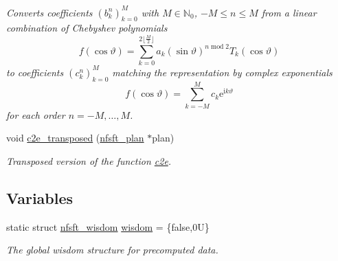\begin{CompactItemize}
\begin{CompactList}\small\item\em Converts coefficients $\left(b_k^n\right)_{k=0}^M$ with $M \in \mathbb{N}_0$, $-M \le n \le M$ from a linear combination of Chebyshev polynomials \[ f(\cos\vartheta) = \sum_{k=0}^{2\lfloor\frac{M}{2}\rfloor} a_k (\sin\vartheta)^{n\;\mathrm{mod}\;2} T_k(\cos\vartheta) \] to coefficients $\left(c_k^n\right)_{k=0}^M$ matching the representation by complex exponentials \[ f(\cos\vartheta) = \sum_{k=-M}^{M} c_k \mathrm{e}^{\mathrm{i}k\vartheta} \] for each order $n=-M,\ldots,M$. \item\end{CompactList}\item 
void \hyperlink{group__nfsft_ga24}{c2e\_\-transposed} (\hyperlink{structnfsft__plan}{nfsft\_\-plan} $\ast$plan)
\begin{CompactList}\small\item\em Transposed version of the function \hyperlink{group__nfsft_ga23}{c2e}. \item\end{CompactList}\end{CompactItemize}
\subsection*{Variables}
\begin{CompactItemize}
\item 
static struct \hyperlink{structnfsft__wisdom}{nfsft\_\-wisdom} \hyperlink{group__nfsft_ga0}{wisdom} = \{false,0U\}
\begin{CompactList}\small\item\em The global wisdom structure for precomputed data. \item\end{CompactList}\end{CompactItemize}


